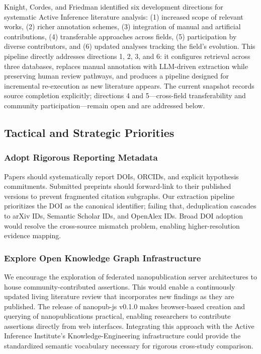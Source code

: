 \documentclass[
  english,
]{article}
\begin{document}
Knight, Cordes, and Friedman \citep{knight2022fep} identified six
development directions for systematic Active Inference literature
analysis: (1) increased scope of relevant works, (2) richer annotation
schemes, (3) integration of manual and artificial contributions, (4)
transferable approaches across fields, (5) participation by diverse
contributors, and (6) updated analyses tracking the field's evolution.
This pipeline directly addresses directions 1, 2, 3, and 6: it
configures retrieval across three databases, replaces manual annotation
with LLM-driven extraction while preserving human review pathways, and
produces a pipeline designed for incremental re-execution as new
literature appears. The current snapshot records source completion
explicitly; directions 4 and 5---cross-field transferability and
community participation---remain open and are addressed below.

\subsection{Tactical and Strategic
Priorities}\label{tactical-and-strategic-priorities}

\subsubsection{Adopt Rigorous Reporting
Metadata}\label{adopt-rigorous-reporting-metadata}

Papers should systematically report DOIs, ORCIDs, and explicit
hypothesis commitments. Submitted preprints should forward-link to their
published versions to prevent fragmented citation subgraphs. Our
extraction pipeline prioritizes the DOI as the canonical identifier;
failing that, deduplication cascades to arXiv IDs, Semantic Scholar IDs,
and OpenAlex IDs. Broad DOI adoption would resolve the cross-source
mismatch problem, enabling higher-resolution evidence mapping.

\subsubsection{Explore Open Knowledge Graph
Infrastructure}\label{explore-open-knowledge-graph-infrastructure}

We encourage the exploration of federated nanopublication server
architectures to house community-contributed assertions. This would
enable a continuously updated living literature review that incorporates
new findings as they are published. The release of nanopub-js v0.1.0
\citep{kuhn2026nanopubjs} makes browser-based creation and querying of
nanopublications practical, enabling researchers to contribute
assertions directly from web interfaces. Integrating this approach with
the Active Inference Institute's Knowledge-Engineering infrastructure
\citep{knight2022fep} could provide the standardized semantic vocabulary
necessary for rigorous cross-study comparison.
\end{document}
